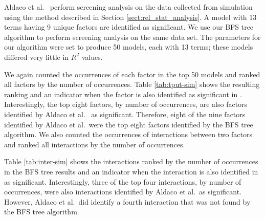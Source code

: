 Aldaco et al.\ \cite{AldacoCS15} perform screening analysis on the data collected from simulation using the method described in Section \ref{sect:rel_stat_analysis}.
A model with 13 terms having 9 unique factors are identified as significant.
We use our BFS tree algorithm to perform screening analysis on the same data set. 
The parameters for our algorithm were set to produce 50 models, each with 13 terms; these models differed very little in $R^2$ values. 

We again counted the occurrences of each factor in the top 50 models and ranked all factors by the number of occurrences. 
Table \ref{tab:tput-sim} shows the resulting ranking and an indicator when the factor is also identified as significant in \cite{AldacoCS15}. 
Interestingly, the top eight factors, by number of occurrences, are also factors identified by Aldaco et al.\ \cite{AldacoCS15} as significant. 
Therefore, eight of the nine factors identified by Aldaco et al.\ were the top eight factors identified by the BFS tree algorithm. 
We also counted the occurrences of interactions between two factors and ranked all interactions by the number of occurrences. 

Table \ref{tab:inter-sim} shows the interactions ranked by the number of occurrences in the BFS tree results and an indicator when the interaction is also identified in \cite{AldacoCS15} as significant. 
Interestingly, three of the top four interactions, by number of occurrences, were also interactions identified by Aldaco et al.\ as significant.
However, Aldaco et al.\ did identify a fourth interaction that was not found by the BFS tree algorithm. 


